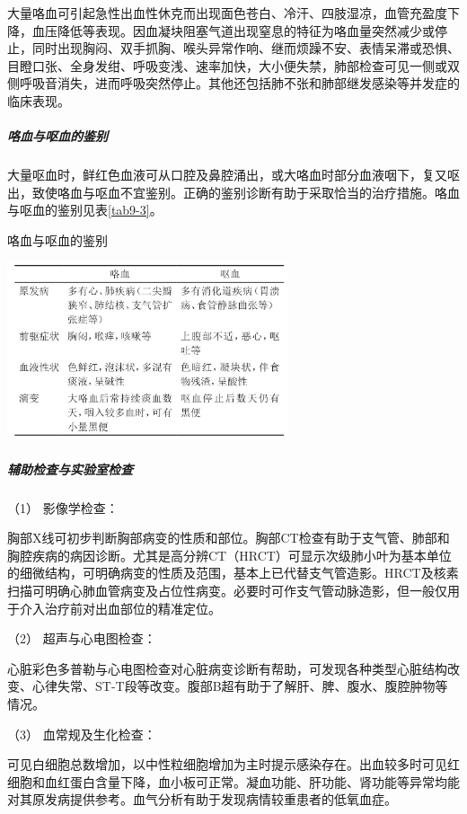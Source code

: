 大量咯血可引起急性出血性休克而出现面色苍白、冷汗、四肢湿凉，血管充盈度下降，血压降低等表现。因血凝块阻塞气道出现窒息的特征为咯血量突然减少或停止，同时出现胸闷、双手抓胸、喉头异常作响、继而烦躁不安、表情呆滞或恐惧、目瞪口张、全身发绀、呼吸变浅、速率加快，大小便失禁，肺部检查可见一侧或双侧呼吸音消失，进而呼吸突然停止。其他还包括肺不张和肺部继发感染等并发症的临床表现。

\subparagraph{咯血与呕血的鉴别}

大量呕血时，鲜红色血液可从口腔及鼻腔涌出，或大咯血时部分血液咽下，复又呕出，致使咯血与呕血不宜鉴别。正确的鉴别诊断有助于采取恰当的治疗措施。咯血与呕血的鉴别见表\ref{tab9-3}。

\begin{table}[htbp]
\centering
\caption{咯血与呕血的鉴别}
\label{tab9-3}
\includegraphics[width=3.26042in,height=2.05208in]{./images/Image00047.jpg}
\end{table}

\subparagraph{辅助检查与实验室检查}

\hypertarget{text00024.htmlux5cux23CHP1-9-2-4-1}{}
（1） 影像学检查：

胸部X线可初步判断胸部病变的性质和部位。胸部CT检查有助于支气管、肺部和胸腔疾病的病因诊断。尤其是高分辨CT（HRCT）可显示次级肺小叶为基本单位的细微结构，可明确病变的性质及范围，基本上已代替支气管造影。HRCT及核素扫描可明确心肺血管病变及占位性病变。必要时可作支气管动脉造影，但一般仅用于介入治疗前对出血部位的精准定位。

\hypertarget{text00024.htmlux5cux23CHP1-9-2-4-2}{}
（2） 超声与心电图检查：

心脏彩色多普勒与心电图检查对心脏病变诊断有帮助，可发现各种类型心脏结构改变、心律失常、ST-T段等改变。腹部B超有助于了解肝、脾、腹水、腹腔肿物等情况。

\hypertarget{text00024.htmlux5cux23CHP1-9-2-4-3}{}
（3） 血常规及生化检查：

可见白细胞总数增加，以中性粒细胞增加为主时提示感染存在。出血较多时可见红细胞和血红蛋白含量下降，血小板可正常。凝血功能、肝功能、肾功能等异常均能对其原发病提供参考。血气分析有助于发现病情较重患者的低氧血症。

